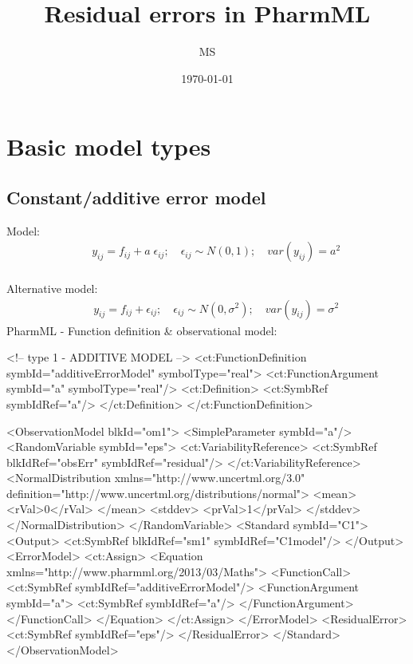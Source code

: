 \documentclass[a4paper,10pt]{article}
\author{MS}
\date{\today}
\title{Residual errors in PharmML}
\begin{document}
\maketitle
\tableofcontents

\newpage

\section{Basic model types}


\subsection{Constant/additive error model}
\label{model1}
Model:
\begin{eqnarray}
&& y_{ij} = f_{ij} + a \; \epsilon_{ij}; \quad \epsilon_{ij} \sim N(0,1); \quad \mathit{var}(y_{ij}) = a^2 \nonumber
\end{eqnarray}
\\
Alternative model:
\begin{eqnarray}
&& y_{ij} = f_{ij} + \epsilon_{ij}; \quad \epsilon_{ij} \sim N(0,\sigma^2); \quad \mathit{var}(y_{ij}) = \sigma^2 \nonumber
\end{eqnarray}
PharmML - Function definition \& observational model:
\begin{xmlcode}
<!-- type 1 - ADDITIVE MODEL -->
<ct:FunctionDefinition symbId="additiveErrorModel" symbolType="real">
    <ct:FunctionArgument symbId="a" symbolType="real"/>
    <ct:Definition>
        <ct:SymbRef symbIdRef="a"/>
    </ct:Definition>
</ct:FunctionDefinition>

<ObservationModel blkId="om1">
    <SimpleParameter symbId="a"/>
    <RandomVariable symbId="eps">
        <ct:VariabilityReference>
            <ct:SymbRef blkIdRef="obsErr" symbIdRef="residual"/>
        </ct:VariabilityReference>
        <NormalDistribution xmlns="http://www.uncertml.org/3.0" definition="http://www.uncertml.org/distributions/normal">
            <mean>
                <rVal>0</rVal>
            </mean>
            <stddev>
                <prVal>1</prVal>
            </stddev>
        </NormalDistribution>
    </RandomVariable>
    <Standard symbId="C1">
        <Output>
            <ct:SymbRef blkIdRef="sm1" symbIdRef="C1model"/>
        </Output>
        <ErrorModel>
            <ct:Assign>
                <Equation xmlns="http://www.pharmml.org/2013/03/Maths">
                    <FunctionCall>
                        <ct:SymbRef symbIdRef="additiveErrorModel"/>
                        <FunctionArgument symbId="a">
                            <ct:SymbRef symbIdRef="a"/>
                        </FunctionArgument>
                    </FunctionCall>
                </Equation>
            </ct:Assign>
        </ErrorModel>
        <ResidualError>
            <ct:SymbRef symbIdRef="eps"/>
        </ResidualError>
    </Standard>
</ObservationModel>
\end{xmlcode}
\end{document}
